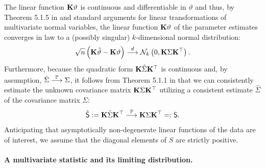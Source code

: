 \documentclass[12pt]{article}
\begin{document}
The linear function $\mathbf{K} \vartheta$ is continuous and differentiable in
$\vartheta$ and thus, by Theorem 5.1.5 in \cite{Lehmann1999} and
standard arguments for linear transformations of multivariate normal
variables,
the linear function $\mathbf{K} \vartheta$ of the parameter estimates
converges in law to a (possibly singular) $k$-dimensional normal
distribution:
\begin{eqnarray} \label{dist_f}
\sqrt{n} \left(\mathbf{K} \hat{\vartheta} - \mathbf{K} \vartheta\right)
\stackrel{d}{\longrightarrow} \mathcal{N}_k\left(0, \mathbf{K} \Sigma \mathbf{K}^\top\right).
\end{eqnarray}
Furthermore, because the quadratic form $\mathbf{K} \hat{\Sigma} \mathbf{K}^\top$
is continuous and, by assumption, $\hat{\Sigma} \stackrel{\mathbb{P}}{\longrightarrow} \Sigma$,
it follows from Theorem 5.1.1 in \cite{Lehmann1999} that we can
consistently estimate the unknown covariance matrix $\mathbf{K} \Sigma \mathbf{K}^\top$ utilizing
a consistent estimate $\hat{\Sigma}$ of the covariance matrix $\Sigma$:
\begin{eqnarray*}
\hat{\textsf{S}} := \mathbf{K} \hat{\Sigma} \mathbf{K}^\top \stackrel{\mathbb{P}}{\longrightarrow} \mathbf{K} \Sigma \mathbf{K}^\top =: \textsf{S}.
\end{eqnarray*}
Anticipating that asymptotically non-degenerate linear functions of the
data are of interest, we assume that the diagonal elements of $S$ are
strictly positive.

\paragraph{A multivariate statistic and its limiting distribution.}
\end{document}
